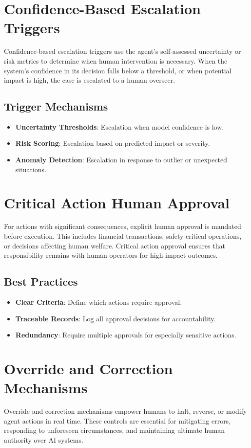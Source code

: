 \begin{TNtwocol}
\section{Confidence-Based Escalation Triggers}
Confidence-based escalation triggers use the agent’s self-assessed uncertainty or risk metrics to determine when human intervention is necessary. When the system’s confidence in its decision falls below a threshold, or when potential impact is high, the case is escalated to a human overseer.

\subsection{Trigger Mechanisms}
\begin{itemize}
    \item \textbf{Uncertainty Thresholds}: Escalation when model confidence is low.
    \item \textbf{Risk Scoring}: Escalation based on predicted impact or severity.
    \item \textbf{Anomaly Detection}: Escalation in response to outlier or unexpected situations.
\end{itemize}

\section{Critical Action Human Approval}
For actions with significant consequences, explicit human approval is mandated before execution. This includes financial transactions, safety-critical operations, or decisions affecting human welfare. Critical action approval ensures that responsibility remains with human operators for high-impact outcomes.

\subsection{Best Practices}
\begin{itemize}
    \item \textbf{Clear Criteria}: Define which actions require approval.
    \item \textbf{Traceable Records}: Log all approval decisions for accountability.
    \item \textbf{Redundancy}: Require multiple approvals for especially sensitive actions.
\end{itemize}

\section{Override and Correction Mechanisms}
Override and correction mechanisms empower humans to halt, reverse, or modify agent actions in real time. These controls are essential for mitigating errors, responding to unforeseen circumstances, and maintaining ultimate human authority over AI systems.


\end{TNtwocol}
